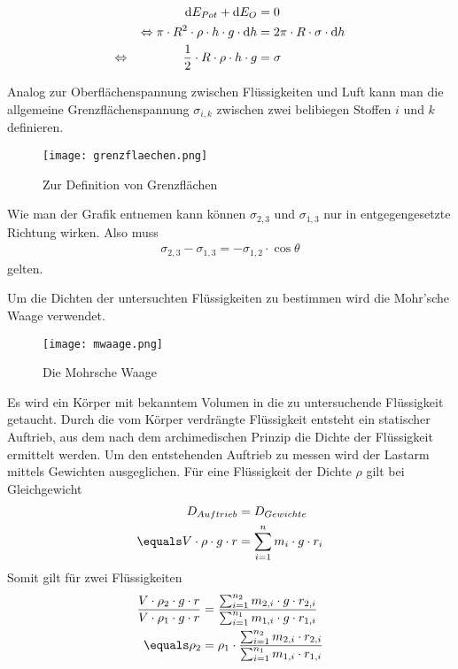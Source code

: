 \documentclass[12pt, a4paper, twoside]{scrartcl}
\begin{document}
\begin{align}
\textup dE_{Pot}+\textup dE_{O}&=0 \nonumber\\
\Leftrightarrow\pi\cdot R^2\cdot\rho\cdot h \cdot g\cdot\textup dh&=2\pi\cdot R\cdot\sigma\cdot\textup dh \nonumber\\
\Leftrightarrow\hspace{1.5cm} \frac{1}{2}\cdot R\cdot\rho\cdot h\cdot g&=\sigma \label{eq:oberflaechenspannung}
\end{align}\newline

Analog zur Oberflächenspannung zwischen Flüssigkeiten und Luft kann man die allgemeine Grenzflächenspannung $\sigma_{i,k}$ zwischen zwei belibiegen Stoffen $i$ und $k$ definieren.
\begin{figure} [h]
\centering
\texttt{[image: grenzflaechen.png]}
\caption{Zur Definition von Grenzflächen\protect\footnotemark}
\end{figure}

Wie man der Grafik entnemen kann können $\sigma_{2,3}$ und $\sigma_{1,3}$ nur in entgegengesetzte Richtung wirken. Also muss
\begin{align*}
 \sigma_{2,3}-\sigma_{1,3}=-\sigma_{1,2}\cdot\cos\theta
\end{align*}
gelten.\newline

Um die Dichten der untersuchten Flüssigkeiten zu bestimmen wird die Mohr'sche Waage verwendet.

\begin{figure} [h]
\centering
\texttt{[image: mwaage.png]}
\caption{Die Mohrsche Waage\protect\footnotemark}
\end{figure}

Es wird ein Körper mit bekanntem Volumen in die zu untersuchende Flüssigkeit getaucht. Durch die vom Körper verdrängte Flüssigkeit entsteht ein statischer Auftrieb, aus dem nach dem archimedischen Prinzip die Dichte der Flüssigkeit ermittelt werden. Um den entstehenden Auftrieb zu messen wird der Lastarm mittels Gewichten ausgeglichen.
Für eine Flüssigkeit der Dichte $\rho$ gilt bei Gleichgewicht
\begin{align}
 D_{Auftrieb} &= D_{Gewichte} \nonumber\\
\equals  V\cdot\rho\cdot g \cdot r &= \sum_{i=1}^{n}m_i\cdot g\cdot r_i
\end{align}
Somit gilt für zwei Flüssigkeiten
\begin{align}
\frac{V\cdot\rho_2\cdot g \cdot r}{V\cdot\rho_1\cdot g \cdot r} &= \frac{\sum_{i=1}^{n_2}m_{2,i}\cdot g\cdot r_{2,i}}{\sum_{i=1}^{n_1}m_{1,i}\cdot g\cdot r_{1,i}} \nonumber\\
\equals \rho_2 &= \rho_1 \cdot \frac{\sum_{i=1}^{n_2}m_{2,i}\cdot r_{2,i}}{\sum_{i=1}^{n_1}m_{1,i}\cdot r_{1,i}} \label{eq:mohrsche_waage}
\end{align}
\end{document}

